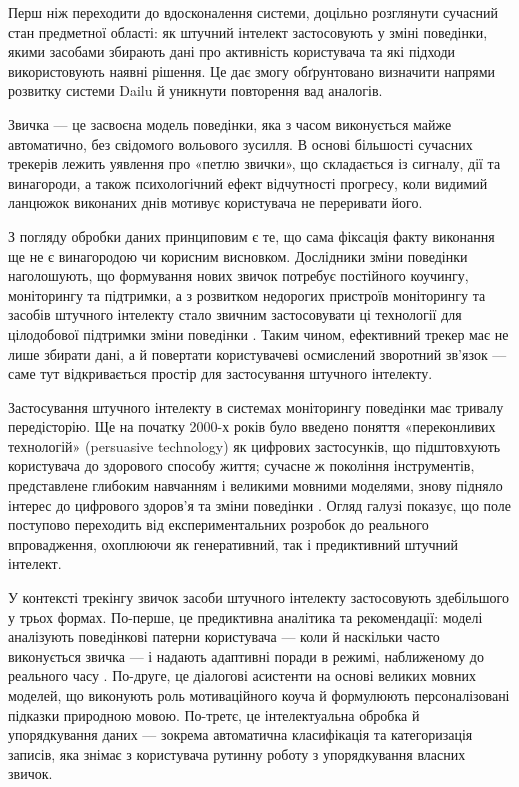 
Перш ніж переходити до вдосконалення системи, доцільно розглянути сучасний стан предметної
області: як штучний інтелект застосовують у зміні поведінки, якими засобами збирають дані про
активність користувача та які підходи використовують наявні рішення.
Це дає змогу обґрунтовано визначити напрями розвитку системи Dailu й уникнути повторення вад
аналогів.


Звичка — це засвоєна модель поведінки, яка з часом виконується майже автоматично, без свідомого
вольового зусилля.
В основі більшості сучасних трекерів лежить уявлення про «петлю звички», що складається із
сигналу, дії та винагороди, а також психологічний ефект відчутності прогресу, коли видимий
ланцюжок виконаних днів мотивує користувача не переривати його.

З погляду обробки даних принциповим є те, що сама фіксація факту виконання ще не є винагородою
чи корисним висновком.
Дослідники зміни поведінки наголошують, що формування нових звичок потребує постійного
коучингу, моніторингу та підтримки, а з розвитком недорогих пристроїв моніторингу та засобів
штучного інтелекту стало звичним застосовувати ці технології для цілодобової підтримки зміни
поведінки .
Таким чином, ефективний трекер має не лише збирати дані, а й повертати користувачеві осмислений
зворотний зв'язок — саме тут відкривається простір для застосування штучного інтелекту.


Застосування штучного інтелекту в системах моніторингу поведінки має тривалу передісторію.
Ще на початку 2000-х років було введено поняття «переконливих технологій» (persuasive
technology) як цифрових застосунків, що підштовхують користувача до здорового способу життя;
сучасне ж покоління інструментів, представлене глибоким навчанням і великими мовними моделями,
знову підняло інтерес до цифрового здоров'я та зміни поведінки .
Огляд галузі показує, що поле поступово переходить від експериментальних розробок до реального
впровадження, охоплюючи як генеративний, так і предиктивний штучний інтелект.

У контексті трекінгу звичок засоби штучного інтелекту застосовують здебільшого у трьох формах.
По-перше, це предиктивна аналітика та рекомендації: моделі аналізують поведінкові патерни
користувача — коли й наскільки часто виконується звичка — і надають адаптивні поради в режимі,
наближеному до реального часу .
По-друге, це діалогові асистенти на основі великих мовних моделей, що виконують роль
мотиваційного коуча й формулюють персоналізовані підказки природною мовою.
По-третє, це інтелектуальна обробка й упорядкування даних — зокрема автоматична класифікація та
категоризація записів, яка знімає з користувача рутинну роботу з упорядкування власних звичок.


